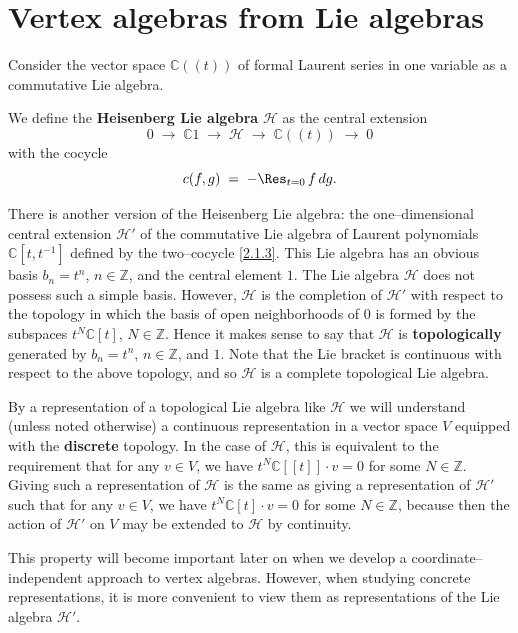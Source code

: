 \documentclass[12pt]{article}
\begin{document}
\section{Vertex algebras from Lie algebras}
Consider the vector space $\mathbb{C}((t))$ of formal Laurent series in one variable as a commutative Lie algebra.

\begin{definition}
    We define the \textbf{Heisenberg Lie algebra} $\mathcal{H}$ as the central extension
    \begin{equation} \label{2.1.2}
        0 \;\longrightarrow\; \mathbb{C}1 \;\longrightarrow\; \mathcal{H} \;\longrightarrow\; \mathbb{C}((t)) \;\longrightarrow\; 0
    \end{equation}
    with the cocycle
    \begin{equation} \label{2.1.3}
        c(f,g) \;=\; -\Res_{t=0}\, f\,dg.
    \end{equation}

    There is another version of the Heisenberg Lie algebra: the one–dimensional central extension $\mathcal{H}'$ of the commutative Lie algebra of Laurent polynomials $\mathbb{C}[t,t^{-1}]$ defined by the two–cocycle \eqref{2.1.3}.
    This Lie algebra has an obvious basis $b_n = t^n$, $n \in \mathbb{Z}$, and the central element $1$. The Lie algebra $\mathcal{H}$ does not possess such a simple basis.
    However, $\mathcal{H}$ is the completion of $\mathcal{H}'$ with respect to the topology in which the basis of open neighborhoods of $0$ is formed by the subspaces $t^N\mathbb{C}[t]$, $N\in\mathbb{Z}$.
    Hence it makes sense to say that $\mathcal{H}$ is \textbf{topologically} generated by $b_n = t^n$, $n\in\mathbb{Z}$, and $1$.
    Note that the Lie bracket is continuous with respect to the above topology, and so $\mathcal{H}$ is a complete topological Lie algebra.

    By a representation of a topological Lie algebra like $\mathcal{H}$ we will understand (unless noted otherwise) a continuous representation in a vector space $V$ equipped with the \textbf{discrete} topology.
    In the case of $\mathcal{H}$, this is equivalent to the requirement that for any $v\in V$, we have $t^N\mathbb{C}[[t]]\cdot v = 0$ for some $N\in\mathbb{Z}$.
    Giving such a representation of $\mathcal{H}$ is the same as giving a representation of $\mathcal{H}'$ such that for any $v\in V$, we have $t^N\mathbb{C}[t]\cdot v = 0$ for some $N\in\mathbb{Z}$, because then the action of $\mathcal{H}'$ on $V$ may be extended to $\mathcal{H}$ by continuity.

    This property will become important later on when we develop a coordinate–independent approach to vertex algebras. However, when studying concrete representations, it is more convenient to view them as representations of the Lie algebra $\mathcal{H}'$.
\end{definition}
\end{document}
